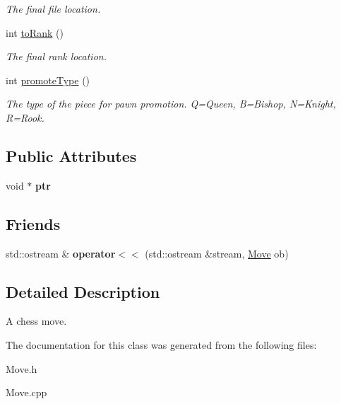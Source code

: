 \begin{DoxyCompactItemize}
\begin{DoxyCompactList}\small\item\em The final file location. \item\end{DoxyCompactList}\item 
\hypertarget{classMove_aa187fa7c6d8fddf491786d9d6710619e}{
int \hyperlink{classMove_aa187fa7c6d8fddf491786d9d6710619e}{toRank} ()}
\label{classMove_aa187fa7c6d8fddf491786d9d6710619e}

\begin{DoxyCompactList}\small\item\em The final rank location. \item\end{DoxyCompactList}\item 
\hypertarget{classMove_a58212e6170fddd72691d1434fed601bc}{
int \hyperlink{classMove_a58212e6170fddd72691d1434fed601bc}{promoteType} ()}
\label{classMove_a58212e6170fddd72691d1434fed601bc}

\begin{DoxyCompactList}\small\item\em The type of the piece for pawn promotion. Q=Queen, B=Bishop, N=Knight, R=Rook. \item\end{DoxyCompactList}\end{DoxyCompactItemize}
\subsection*{Public Attributes}
\begin{DoxyCompactItemize}
\item 
\hypertarget{classMove_ac08b67dedee5bf43185da443ccbf1333}{
void $\ast$ {\bfseries ptr}}
\label{classMove_ac08b67dedee5bf43185da443ccbf1333}

\end{DoxyCompactItemize}
\subsection*{Friends}
\begin{DoxyCompactItemize}
\item 
\hypertarget{classMove_aa09954654fba5a6276760e1da63a5a4c}{
std::ostream \& {\bfseries operator$<$$<$} (std::ostream \&stream, \hyperlink{classMove}{Move} ob)}
\label{classMove_aa09954654fba5a6276760e1da63a5a4c}

\end{DoxyCompactItemize}


\subsection{Detailed Description}
A chess move. 

The documentation for this class was generated from the following files:\begin{DoxyCompactItemize}
\item 
Move.h\item 
Move.cpp\end{DoxyCompactItemize}
